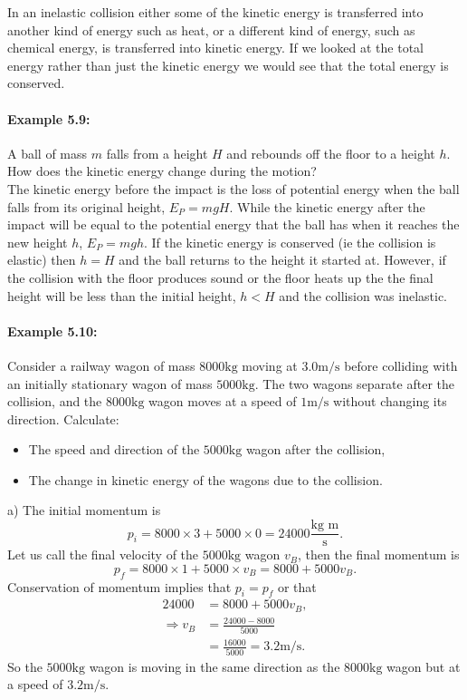 In an inelastic collision either some of the kinetic energy is transferred into another kind of energy such as heat, or a different kind of energy, such as chemical energy, is transferred into kinetic energy. If we looked at the total energy rather than just the kinetic energy we would see that the total energy is conserved.\\

\paragraph{Example 5.9:} A ball of mass $m$ falls from a height $H$ and rebounds off the floor to a height $h$. How does the kinetic energy change during the motion?\\

The kinetic energy before the impact is the loss of potential energy when the ball falls from its original height, $E_{P}=mgH$. While the kinetic energy after the impact will be equal to the potential energy that the ball has when it reaches the new height $h$, $E_{P}=mgh$. If the kinetic energy is conserved (ie the collision is elastic) then $h=H$ and the ball returns to the height it started at. However, if the collision with the floor produces sound or the floor heats up the the final height will be less than the initial height, $h<H$ and the collision was inelastic.

\paragraph{Example 5.10:} Consider a railway wagon of mass $8000\text{kg}$ moving at $3.0\text{m/s}$ before colliding with an initially stationary wagon of mass $5000\text{kg}$. The two wagons separate after the collision, and the $8000\text{kg}$ wagon moves at a speed of $1\text{m/s}$ without changing its direction. Calculate:
\begin{itemize}
\setlength{\itemsep}{-5pt}
    \item[a)] The speed and direction of the $5000\text{kg}$ wagon after the collision,
    \item[b)] The change in kinetic energy of the wagons due to the collision.
\end{itemize} 

a) The initial momentum is 
\begin{equation*}
p_{i}=8000\times 3 +5000\times 0=24 000\frac{\text{kg m}}{\text{s}}.
\end{equation*}
Let us call the final velocity of the $5000\text{kg}$ wagon $v_{B}$, then the final momentum is
\begin{equation*}
p_{f}=8000\times 1 +5000\times v_{B}=8000+5000v_{B}.
\end{equation*}
Conservation of momentum implies that $p_{i}=p_{f}$ or that
\begin{align*}
24 000&=8000+5000v_{B},\\
\Rightarrow v_{B}&=\frac{24000-8000}{5000}\\
&=\frac{16000}{5000}=3.2\text{m/s}.
\end{align*}
So the $5000\text{kg}$ wagon is moving in the same direction as the $8000\text{kg}$ wagon but at a speed of $3.2\text{m/s}$.\\

